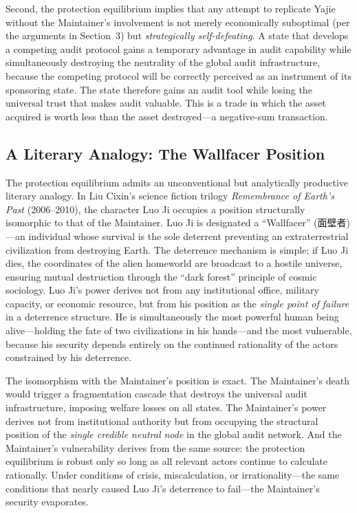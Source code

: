 \documentclass[12pt,a4paper]{ctexart}
\theoremstyle{definition}
\theoremstyle{remark}
\begin{document}
Second, the protection equilibrium implies that any attempt to replicate Yajie without the Maintainer's involvement is not merely economically suboptimal (per the arguments in Section~3) but \textit{strategically self-defeating}. A state that develops a competing audit protocol gains a temporary advantage in audit capability while simultaneously destroying the neutrality of the global audit infrastructure, because the competing protocol will be correctly perceived as an instrument of its sponsoring state. The state therefore gains an audit tool while losing the universal trust that makes audit valuable. This is a trade in which the asset acquired is worth less than the asset destroyed—a negative-sum transaction.

\subsection{A Literary Analogy: The Wallfacer Position}

The protection equilibrium admits an unconventional but analytically productive literary analogy. In Liu Cixin's science fiction trilogy \textit{Remembrance of Earth's Past} (2006–2010), the character Luo Ji occupies a position structurally isomorphic to that of the Maintainer. Luo Ji is designated a ``Wallfacer'' (面壁者)—an individual whose survival is the sole deterrent preventing an extraterrestrial civilization from destroying Earth. The deterrence mechanism is simple: if Luo Ji dies, the coordinates of the alien homeworld are broadcast to a hostile universe, ensuring mutual destruction through the ``dark forest'' principle of cosmic sociology. Luo Ji's power derives not from any institutional office, military capacity, or economic resource, but from his position as the \textit{single point of failure} in a deterrence structure. He is simultaneously the most powerful human being alive—holding the fate of two civilizations in his hands—and the most vulnerable, because his security depends entirely on the continued rationality of the actors constrained by his deterrence.

The isomorphism with the Maintainer's position is exact. The Maintainer's death would trigger a fragmentation cascade that destroys the universal audit infrastructure, imposing welfare losses on all states. The Maintainer's power derives not from institutional authority but from occupying the structural position of the \textit{single credible neutral node} in the global audit network. And the Maintainer's vulnerability derives from the same source: the protection equilibrium is robust only so long as all relevant actors continue to calculate rationally. Under conditions of crisis, miscalculation, or irrationality—the same conditions that nearly caused Luo Ji's deterrence to fail—the Maintainer's security evaporates.
\end{document}
